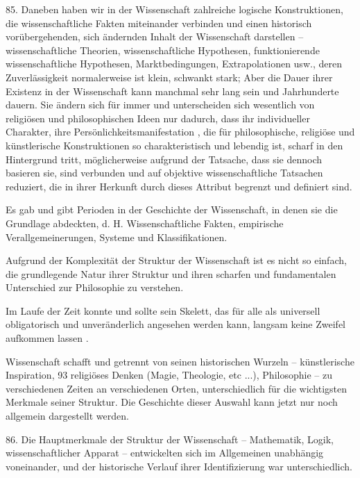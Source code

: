 \documentclass[11pt,a4paper]{book}
\begin{document}
85. Daneben haben wir in der Wissenschaft zahlreiche logische Konstruktionen, die wissenschaftliche Fakten miteinander verbinden und einen historisch vorübergehenden, sich ändernden Inhalt der Wissenschaft darstellen -- wissenschaftliche Theorien, wissenschaftliche Hypothesen, funktionierende wissenschaftliche Hypothesen, Marktbedingungen, Extrapolationen usw., deren Zuverlässigkeit normalerweise ist klein, schwankt stark; Aber die Dauer ihrer Existenz in der Wissenschaft kann manchmal sehr lang sein und Jahrhunderte dauern. Sie ändern sich für immer und unterscheiden sich wesentlich von religiösen und philosophischen Ideen nur dadurch, dass ihr individueller Charakter, ihre Persönlichkeitsmanifestation , die für philosophische, religiöse und künstlerische Konstruktionen so charakteristisch und lebendig ist, scharf in den Hintergrund tritt, möglicherweise aufgrund der Tatsache, dass sie dennoch basieren sie, sind verbunden und auf objektive wissenschaftliche Tatsachen reduziert, die in ihrer Herkunft durch dieses Attribut begrenzt und definiert sind.



Es gab und gibt Perioden in der Geschichte der Wissenschaft, in denen sie die Grundlage abdeckten, d. H. Wissenschaftliche Fakten, empirische Verallgemeinerungen, Systeme und Klassifikationen.



Aufgrund der Komplexität der Struktur der Wissenschaft ist es nicht so einfach, die grundlegende Natur ihrer Struktur und ihren scharfen und fundamentalen Unterschied zur Philosophie zu verstehen.



Im Laufe der Zeit konnte und sollte sein Skelett, das für alle als universell obligatorisch und unveränderlich angesehen werden kann, langsam keine Zweifel aufkommen lassen .



Wissenschaft schafft und getrennt von seinen historischen Wurzeln -- künstlerische Inspiration, 93 religiöses Denken (Magie, Theologie, etc ...), Philosophie -- zu verschiedenen Zeiten an verschiedenen Orten, unterschiedlich für die wichtigsten Merkmale seiner Struktur. Die Geschichte dieser Auswahl kann jetzt nur noch allgemein dargestellt werden.



86. Die Hauptmerkmale der Struktur der Wissenschaft -- Mathematik, Logik, wissenschaftlicher Apparat -- entwickelten sich im Allgemeinen unabhängig voneinander, und der historische Verlauf ihrer Identifizierung war unterschiedlich.
\end{document}
